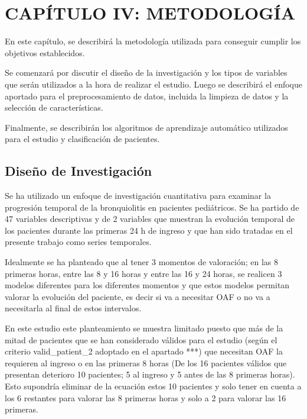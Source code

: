 \section{CAPÍTULO IV: METODOLOGÍA}\label{sec:methodology}

En este capítulo, se describirá la metodología utilizada para conseguir cumplir los objetivos establecidos. 

Se comenzará por discutir el diseño de la investigación y los tipos de variables que serán utilizados a la hora de realizar el estudio. Luego se describirá el enfoque aportado para el preprocesamiento de datos, incluida la limpieza de datos y la selección de características.

Finalmente, se describirán los algoritmos de aprendizaje automático utilizados para el estudio y clasificación de pacientes. 

\subsection{Diseño de Investigación}

Se ha utilizado un enfoque de investigación cuantitativa para examinar la progresión temporal de la bronquiolitis en pacientes pediátricos. Se ha partido de 47 variables descriptivas y de 2 variables que muestran la evolución temporal de los pacientes durante las primeras 24 h de ingreso y que han sido tratadas en el presente trabajo como series temporales. 


Idealmente se ha planteado que al tener 3 momentos de valoración; en las 8 primeras horas, entre las 8 y 16 horas y entre las 16 y 24 horas, se realicen 3 modelos diferentes para los diferentes momentos y que estos modelos permitan valorar la evolución del paciente, es decir si va a necesitar OAF o no va a necesitarla al final de estos intervalos.

En este estudio este planteamiento se muestra limitado puesto que más de la mitad de pacientes que se han considerado válidos para el estudio (según el criterio valid_patient_2 adoptado en el apartado ***) que necesitan OAF la requieren al ingreso o en las primeras 8 horas (De los 16 pacientes válidos que presentan deterioro 10 pacientes; 5 al ingreso y 5 antes de las 8 primeras horas). Esto supondría eliminar de la ecuación estos 10 pacientes y solo tener en cuenta a los 6 restantes para valorar las 8 primeras horas y solo a 2 para valorar las 16 primeras.

